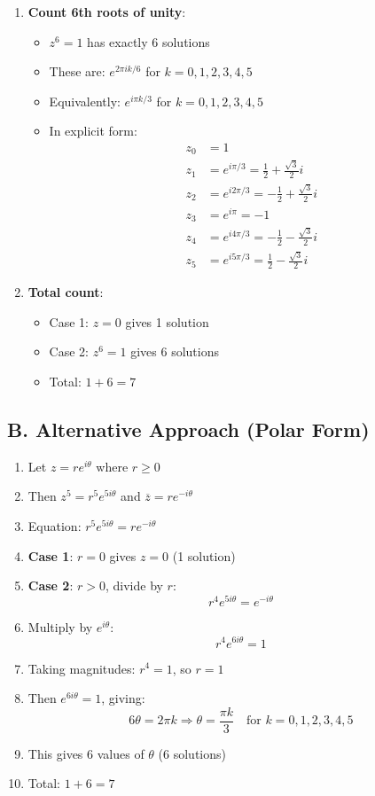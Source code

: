 \documentclass[11pt]{article}
\begin{document}
\begin{solutionbox}
\begin{enumerate}[leftmargin=*]
    \item \textbf{Count 6th roots of unity}:
    \begin{itemize}
        \item $z^6 = 1$ has exactly 6 solutions
        \item These are: $e^{2\pi i k/6}$ for $k = 0, 1, 2, 3, 4, 5$
        \item Equivalently: $e^{i\pi k/3}$ for $k = 0, 1, 2, 3, 4, 5$
        \item In explicit form:
        \begin{align*}
        z_0 &= 1\\
        z_1 &= e^{i\pi/3} = \frac{1}{2} + \frac{\sqrt{3}}{2}i\\
        z_2 &= e^{i2\pi/3} = -\frac{1}{2} + \frac{\sqrt{3}}{2}i\\
        z_3 &= e^{i\pi} = -1\\
        z_4 &= e^{i4\pi/3} = -\frac{1}{2} - \frac{\sqrt{3}}{2}i\\
        z_5 &= e^{i5\pi/3} = \frac{1}{2} - \frac{\sqrt{3}}{2}i
        \end{align*}
    \end{itemize}
    
    \item \textbf{Total count}:
    \begin{itemize}
        \item Case 1: $z = 0$ gives 1 solution
        \item Case 2: $z^6 = 1$ gives 6 solutions
        \item Total: $1 + 6 = 7$
    \end{itemize}
\end{enumerate}

\subsection*{B. Alternative Approach (Polar Form)}
\begin{enumerate}[leftmargin=*]
    \item Let $z = re^{i\theta}$ where $r \geq 0$
    \item Then $z^5 = r^5 e^{5i\theta}$ and $\overline{z} = re^{-i\theta}$
    \item Equation: $r^5 e^{5i\theta} = re^{-i\theta}$
    \item \textbf{Case 1}: $r = 0$ gives $z = 0$ (1 solution)
    \item \textbf{Case 2}: $r > 0$, divide by $r$:
    \[r^4 e^{5i\theta} = e^{-i\theta}\]
    \item Multiply by $e^{i\theta}$:
    \[r^4 e^{6i\theta} = 1\]
    \item Taking magnitudes: $r^4 = 1$, so $r = 1$
    \item Then $e^{6i\theta} = 1$, giving:
    \[6\theta = 2\pi k \Rightarrow \theta = \frac{\pi k}{3} \quad \text{for } k = 0, 1, 2, 3, 4, 5\]
    \item This gives 6 values of $\theta$ (6 solutions)
    \item Total: $1 + 6 = 7$
\end{enumerate}


\end{solutionbox}
\end{document}
